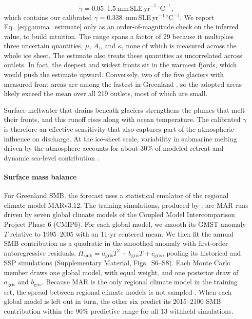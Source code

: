 \documentclass[draft,linenumbers]{agujournal2025}
\begin{document}
\begin{equation}
	\widetilde{\gamma} = 0.05\text{--}1.5~\mathrm{mm\,SLE\,yr}^{-1}\,{}^\circ\mathrm{C}^{-1},
	\label{eq:gamma_estimate}
\end{equation}
which contains our calibrated $\gamma = 0.338$~mm\,SLE\,yr$^{-1}$\,$^\circ$C$^{-1}$. We report Eq.~\ref{eq:gamma_estimate} only as an order-of-magnitude check on the inferred value, to build intuition. The range spans a factor of 29 because it multiplies three uncertain quantities, $\mu$, $A_{\mathrm{f}}$, and $\kappa$, none of which is measured across the whole ice sheet. The estimate also treats these quantities as uncorrelated across outlets. In fact, the deepest and widest fronts sit in the warmest fjords, which would push the estimate upward. Conversely, two of the five glaciers with measured front areas are among the fastest in Greenland \citep{Rignot2016}, so the adopted areas likely exceed the mean over all 219 outlets, most of which are small.

Surface meltwater that drains beneath glaciers strengthens the plumes that melt their fronts, and this runoff rises along with ocean temperature. The calibrated $\gamma$ is therefore an effective sensitivity that also captures part of the atmospheric influence on discharge. At the ice-sheet scale, variability in submarine melting driven by the atmosphere accounts for about 30\% of modeled retreat and dynamic sea-level contribution \citep{Slater2022}.

\paragraph{Surface mass balance}
\label{s:greenland_smb}

For Greenland SMB, the forecast uses a statistical emulator of the regional climate model MARv3.12. The training simulations, produced by \citet{Boberg2026}, are MAR runs driven by seven global climate models of the Coupled Model Intercomparison Project Phase 6 (CMIP6). For each global model, we smooth its GMST anomaly $T$ relative to 1995--2005 with an 11-yr centered mean. We then fit the annual SMB contribution as a quadratic in the smoothed anomaly with first-order autoregressive residuals, $\dot{H}_{\mathrm{smb}} = a_{\mathrm{gris}}T^2 + b_{\mathrm{gris}}T + c_{\mathrm{gris}}$, pooling its historical and SSP simulations (Supplementary Material, Figs.~S6--S8). Each Monte Carlo member draws one global model, with equal weight, and one posterior draw of $a_{\mathrm{gris}}$ and $b_{\mathrm{gris}}$. Because MAR is the only regional climate model in the training set, the spread between regional climate models is not sampled \citep{Glaude2024}. When each global model is left out in turn, the other six predict its 2015--2100 SMB contribution within the 90\% predictive range for all 13 withheld simulations.
\end{document}

